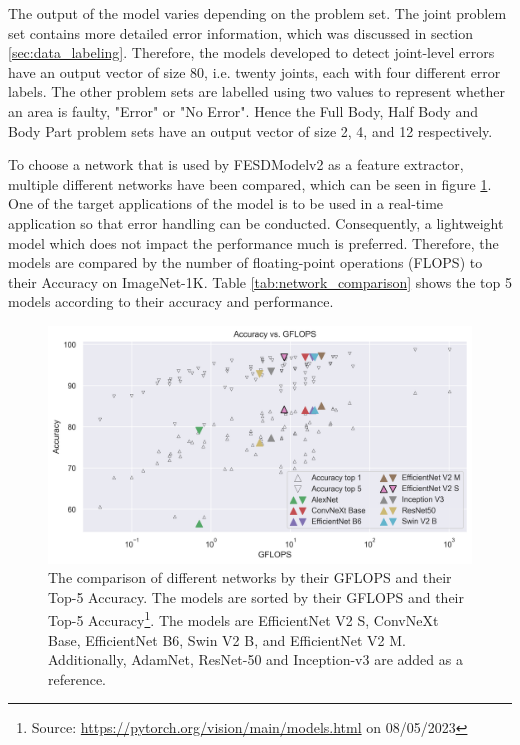 The output of the model varies depending on the problem set. The joint problem set contains more detailed error information, which was discussed in section \ref{sec:data_labeling}. Therefore, the models developed to detect joint-level errors have an output vector of size 80, i.e. twenty joints, each with four different error labels. The other problem sets are labelled using two values to represent whether an area is faulty, "Error" or "No Error". Hence the Full Body, Half Body and Body Part problem sets have an output vector of size 2, 4, and 12 respectively.

To choose a network that is used by FESDModelv2 as a feature extractor, multiple different networks have been compared, which can be seen in figure \ref{fig:network_comparison}. One of the target applications of the model is to be used in a real-time application so that error handling can be conducted. Consequently, a lightweight model which does not impact the performance much is preferred. Therefore, the models are compared by the number of floating-point operations (FLOPS) to their Accuracy on ImageNet-1K. Table \ref{tab:network_comparison} shows the top 5 models according to their accuracy and performance. 

\begin{figure}[htbp]
  \centering
  \includegraphics[width=.8\linewidth]{figures/network/networks.png}
  \caption[Network comparison]{The comparison of different networks by their GFLOPS and their Top-5 Accuracy. The models are sorted by their GFLOPS and their Top-5 Accuracy\footnote{Source: \url{https://pytorch.org/vision/main/models.html} on 08/05/2023}. The models are EfficientNet V2 S, ConvNeXt Base, EfficientNet B6, Swin V2 B, and EfficientNet V2 M. Additionally, AdamNet, ResNet-50 and Inception-v3 are added as a reference.}
  \label{fig:network_comparison}
\end{figure}

